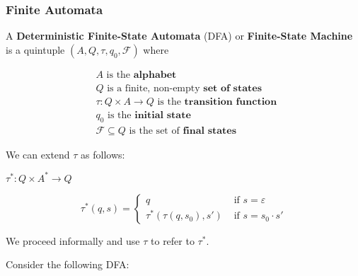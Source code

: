 \subsubsection{Finite Automata}\label{subsubsec:finite-automata}

\begin{definition}
A \textbf{Deterministic Finite-State Automata} (DFA) or \textbf{Finite-State Machine} is a quintuple \((A, Q, \tau, q_0, \mathcal{F})\) where 

\begin{align*}
    &A\text{ is the }\textbf{alphabet}\\
    &Q\text{ is a finite, non-empty }\textbf{set of states}\\
    &\tau:Q\times A\to Q\text{ is the }\textbf{transition function }\\
    &q_0\text{ is the }\textbf{initial state}\\
    &\mathcal{F}\subseteq Q\text{ is the set of }\textbf{final states}
\end{align*}
\end{definition}
We can extend \(\tau \) as follows: 

\(\tau^*:Q\times A^*\to Q\)

\[\tau^*(q, s) = \begin{cases} q &\mbox{ if } s=\varepsilon \\
                             \tau^*(\tau(q, s_0), s') &\mbox{ if } s=s_0\cdot s'\end{cases}\]

We proceed informally and use \(\tau \) to refer to \(\tau^*\). 

Consider the following DFA\@:

\begin{center}
\end{center}

